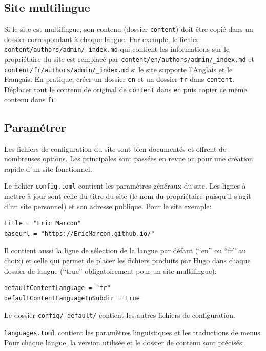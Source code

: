 \documentclass[
  12pt,
  french,
  a4paper,
  extrafontsizes,onecolumn,openright
  ]{memoir}
\begin{document}
\subsection{Site multilingue}\label{site-multilingue}

Si le site est multilingue, son contenu (dossier \texttt{content}) doit être copié dans un dossier correspondant à chaque langue.
Par exemple, le fichier \texttt{content/authors/admin/\_index.md} qui contient les informations sur le propriétaire du site est remplacé par \texttt{content/en/authors/admin/\_index.md} et \texttt{content/fr/authors/admin}\break\texttt{/\_index.md} si le site supporte l'Anglais et le Français.
En pratique, créer un dossier \texttt{en} et un dossier \texttt{fr} dans \texttt{content}.
Déplacer tout le contenu de original de \texttt{content} dans \texttt{en} puis copier ce même contenu dans \texttt{fr}.

\subsection{Paramétrer}\label{paramuxe9trer}

Les fichiers de configuration du site sont bien documentés et offrent de nombreuses options.
Les principales sont passées en revue ici pour une création rapide d'un site fonctionnel.

Le fichier \texttt{config.toml} contient les paramètres généraux du site.
Les lignes à mettre à jour sont celle du titre du site (le nom du propriétaire puisqu'il s'agit d'un site personnel) et son adresse publique.
Pour le site exemple:

\begin{verbatim}
title = "Eric Marcon"
baseurl = "https://EricMarcon.github.io/"
\end{verbatim}

Il contient aussi la ligne de sélection de la langue par défaut (\enquote{en} ou \enquote{fr} au choix) et celle qui permet de placer les fichiers produits par Hugo dans chaque dossier de langue (\enquote{true} obligatoirement pour un site multilingue):

\begin{verbatim}
defaultContentLanguage = "fr"
defaultContentLanguageInSubdir = true
\end{verbatim}

Le dossier \texttt{config/\_default/} contient les autres fichiers de configuration.

\texttt{languages.toml} contient les paramètres linguistiques et les traductions de menus.
Pour chaque langue, la version utilisée et le dossier de contenu sont précisés:
\end{document}
